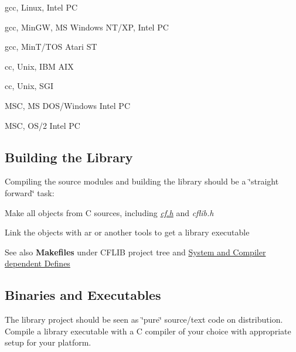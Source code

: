 \begin{DoxyItemize}
\item gcc, Linux, Intel P\-C
\begin{DoxyItemize}
\item gcc, Min\-G\-W, M\-S Windows N\-T/\-X\-P, Intel P\-C
\item gcc, Min\-T/\-T\-O\-S Atari S\-T
\item cc, Unix, I\-B\-M A\-I\-X
\item cc, Unix, S\-G\-I
\item M\-S\-C, M\-S D\-O\-S/\-Windows Intel P\-C
\item M\-S\-C, O\-S/2 Intel P\-C
\end{DoxyItemize}
\end{DoxyItemize}\hypertarget{development_library_building}{}\subsection{Building the Library}\label{development_library_building}
Compiling the source modules and building the library should be a \char`\"{}straight forward\char`\"{} task\-:
\begin{DoxyItemize}
\item Make all objects from C sources, including {\itshape \hyperlink{cf_8h}{cf.\-h}\/} and {\itshape cflib.\-h\/} 
\item Link the objects with {\ttfamily ar} or another tools to get a library executable
\end{DoxyItemize}

\begin{DoxySeeAlso}{See also}
{\bfseries Makefiles} under C\-F\-L\-I\-B project tree and \hyperlink{development_compilation_options}{System and Compiler dependent Defines}
\end{DoxySeeAlso}
\hypertarget{development_binaries}{}\subsection{Binaries and Executables}\label{development_binaries}

\begin{DoxyItemize}
\item The library project should be seen as \char`\"{}pure\char`\"{} source/text code on distribution. Compile a library executable with a C compiler of your choice with appropriate setup for your platform.
\end{DoxyItemize}


